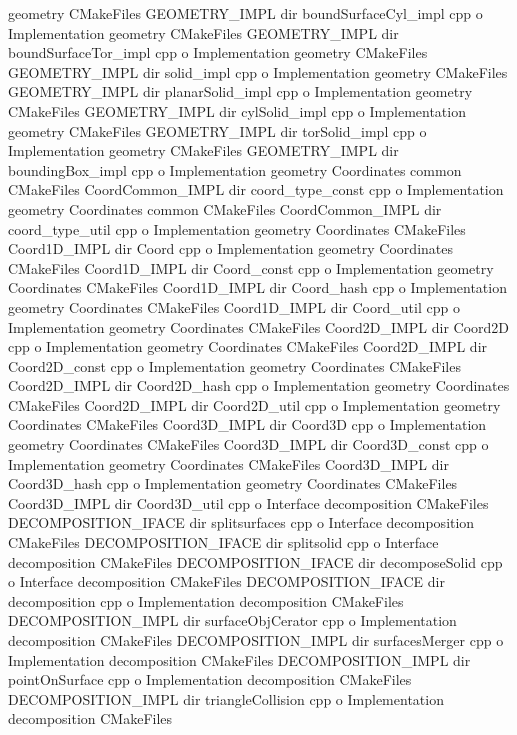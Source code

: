 \begin{DoxyCompactItemize}
geometry C\+Make\+Files G\+E\+O\+M\+E\+T\+R\+Y\+\_\+\+I\+M\+PL dir bound\+Surface\+Cyl\+\_\+impl cpp o Implementation geometry C\+Make\+Files G\+E\+O\+M\+E\+T\+R\+Y\+\_\+\+I\+M\+PL dir bound\+Surface\+Tor\+\_\+impl cpp o Implementation geometry C\+Make\+Files G\+E\+O\+M\+E\+T\+R\+Y\+\_\+\+I\+M\+PL dir solid\+\_\+impl cpp o Implementation geometry C\+Make\+Files G\+E\+O\+M\+E\+T\+R\+Y\+\_\+\+I\+M\+PL dir planar\+Solid\+\_\+impl cpp o Implementation geometry C\+Make\+Files G\+E\+O\+M\+E\+T\+R\+Y\+\_\+\+I\+M\+PL dir cyl\+Solid\+\_\+impl cpp o Implementation geometry C\+Make\+Files G\+E\+O\+M\+E\+T\+R\+Y\+\_\+\+I\+M\+PL dir tor\+Solid\+\_\+impl cpp o Implementation geometry C\+Make\+Files G\+E\+O\+M\+E\+T\+R\+Y\+\_\+\+I\+M\+PL dir bounding\+Box\+\_\+impl cpp o Implementation geometry Coordinates common C\+Make\+Files Coord\+Common\+\_\+\+I\+M\+PL dir coord\+\_\+type\+\_\+const cpp o Implementation geometry Coordinates common C\+Make\+Files Coord\+Common\+\_\+\+I\+M\+PL dir coord\+\_\+type\+\_\+util cpp o Implementation geometry Coordinates C\+Make\+Files Coord1\+D\+\_\+\+I\+M\+PL dir Coord cpp o Implementation geometry Coordinates C\+Make\+Files Coord1\+D\+\_\+\+I\+M\+PL dir Coord\+\_\+const cpp o Implementation geometry Coordinates C\+Make\+Files Coord1\+D\+\_\+\+I\+M\+PL dir Coord\+\_\+hash cpp o Implementation geometry Coordinates C\+Make\+Files Coord1\+D\+\_\+\+I\+M\+PL dir Coord\+\_\+util cpp o Implementation geometry Coordinates C\+Make\+Files Coord2\+D\+\_\+\+I\+M\+PL dir Coord2D cpp o Implementation geometry Coordinates C\+Make\+Files Coord2\+D\+\_\+\+I\+M\+PL dir Coord2\+D\+\_\+const cpp o Implementation geometry Coordinates C\+Make\+Files Coord2\+D\+\_\+\+I\+M\+PL dir Coord2\+D\+\_\+hash cpp o Implementation geometry Coordinates C\+Make\+Files Coord2\+D\+\_\+\+I\+M\+PL dir Coord2\+D\+\_\+util cpp o Implementation geometry Coordinates C\+Make\+Files Coord3\+D\+\_\+\+I\+M\+PL dir Coord3D cpp o Implementation geometry Coordinates C\+Make\+Files Coord3\+D\+\_\+\+I\+M\+PL dir Coord3\+D\+\_\+const cpp o Implementation geometry Coordinates C\+Make\+Files Coord3\+D\+\_\+\+I\+M\+PL dir Coord3\+D\+\_\+hash cpp o Implementation geometry Coordinates C\+Make\+Files Coord3\+D\+\_\+\+I\+M\+PL dir Coord3\+D\+\_\+util cpp o Interface decomposition C\+Make\+Files D\+E\+C\+O\+M\+P\+O\+S\+I\+T\+I\+O\+N\+\_\+\+I\+F\+A\+CE dir splitsurfaces cpp o Interface decomposition C\+Make\+Files D\+E\+C\+O\+M\+P\+O\+S\+I\+T\+I\+O\+N\+\_\+\+I\+F\+A\+CE dir splitsolid cpp o Interface decomposition C\+Make\+Files D\+E\+C\+O\+M\+P\+O\+S\+I\+T\+I\+O\+N\+\_\+\+I\+F\+A\+CE dir decompose\+Solid cpp o Interface decomposition C\+Make\+Files D\+E\+C\+O\+M\+P\+O\+S\+I\+T\+I\+O\+N\+\_\+\+I\+F\+A\+CE dir decomposition cpp o Implementation decomposition C\+Make\+Files D\+E\+C\+O\+M\+P\+O\+S\+I\+T\+I\+O\+N\+\_\+\+I\+M\+PL dir surface\+Obj\+Cerator cpp o Implementation decomposition C\+Make\+Files D\+E\+C\+O\+M\+P\+O\+S\+I\+T\+I\+O\+N\+\_\+\+I\+M\+PL dir surfaces\+Merger cpp o Implementation decomposition C\+Make\+Files D\+E\+C\+O\+M\+P\+O\+S\+I\+T\+I\+O\+N\+\_\+\+I\+M\+PL dir point\+On\+Surface cpp o Implementation decomposition C\+Make\+Files D\+E\+C\+O\+M\+P\+O\+S\+I\+T\+I\+O\+N\+\_\+\+I\+M\+PL dir triangle\+Collision cpp o Implementation decomposition C\+Make\+Files 
\end{DoxyCompactItemize}
